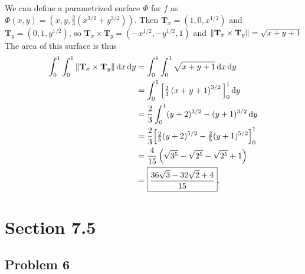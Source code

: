 \documentclass[11pt]{article}
\begin{document}
We can define a parametrized surface $\Phi$ for $f$ as $\Phi(x, y) = \left(x, y, \tfrac{2}{3} (x^{3/2} + y^{3/2})\right)$. Then $\mathbf{T}_{x} = (1, 0, x^{1/2})$ and $\mathbf{T}_{y} = (0, 1, y^{1/2})$, so $\mathbf{T}_{x} \times \mathbf{T}_{y} = \left( -x^{1/2}, -y^{1/2}, 1 \right)$ and $\norm{\mathbf{T}_{x} \times  \mathbf{T}_{y}} = \sqrt{x + y + 1}$ The area of this surface is thus
\begin{align*}
	\int_{0}^{1} \int_{0}^{1} \norm{\mathbf{T}_{x} \times \mathbf{T}_{y}} \dd{x} \dd{y} &= \int_{0}^{1} \int_{0}^{1} \sqrt{x + y + 1} \dd{x} \dd{y} \\
	&= \int_{0}^{1} \Big[ \tfrac{2}{3} \left( x + y + 1 \right)^{3/2} \Big]_{0}^{1} \dd{y} \\
	&= \frac{2}{3} \int_{0}^{1} (y + 2)^{3/2} - (y + 1)^{3/2} \dd{y} \\
	&= \frac{2}{3} \Big[ \tfrac{2}{5} (y + 2)^{5/2} - \tfrac{2}{5} (y + 1)^{5/2} \Big]_{0}^{1} \\
	&= \frac{4}{15} \left( \sqrt{3^{5}} - \sqrt{2^{5}} - \sqrt{2^{5}} + 1  \right) \\
	&= \boxed{\frac{36 \sqrt{3} - 32 \sqrt{2} + 4}{15}}.
\end{align*}


\section{Section 7.5}


\subsection*{Problem 6}
\end{document}
